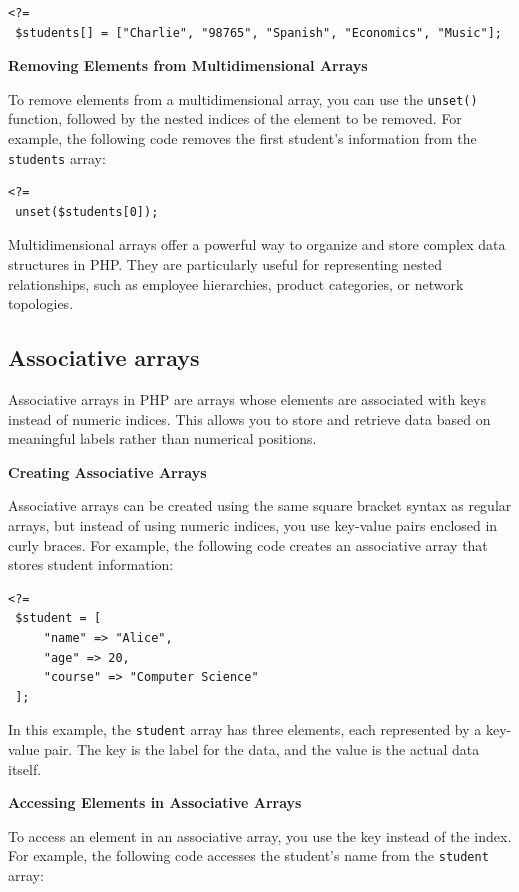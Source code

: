 \documentclass[11pt]{article}
\begin{document}
\begin{verbatim}
<?=
 $students[] = ["Charlie", "98765", "Spanish", "Economics", "Music"];
\end{verbatim}

\textbf{Removing Elements from Multidimensional Arrays}

To remove elements from a multidimensional array, you can use the
\texttt{unset()} function, followed by the nested indices of the element to be
removed. For example, the following code removes the first student's
information from the \texttt{students} array:

\begin{verbatim}
<?=
 unset($students[0]);
\end{verbatim}

Multidimensional arrays offer a powerful way to organize and store
complex data structures in PHP. They are particularly useful for
representing nested relationships, such as employee hierarchies, product
categories, or network topologies.

\subsection{Associative arrays}
\label{sec:org42ec974}
Associative arrays in PHP are arrays whose elements are associated with
keys instead of numeric indices. This allows you to store and retrieve
data based on meaningful labels rather than numerical positions.

\textbf{Creating Associative Arrays}

Associative arrays can be created using the same square bracket syntax
as regular arrays, but instead of using numeric indices, you use
key-value pairs enclosed in curly braces. For example, the following
code creates an associative array that stores student information:

\begin{verbatim}
<?=
 $student = [
     "name" => "Alice",
     "age" => 20,
     "course" => "Computer Science"
 ];
\end{verbatim}

In this example, the \texttt{student} array has three elements, each
represented by a key-value pair. The key is the label for the data, and
the value is the actual data itself.

\textbf{Accessing Elements in Associative Arrays}

To access an element in an associative array, you use the key instead of
the index. For example, the following code accesses the student's name
from the \texttt{student} array:
\end{document}
